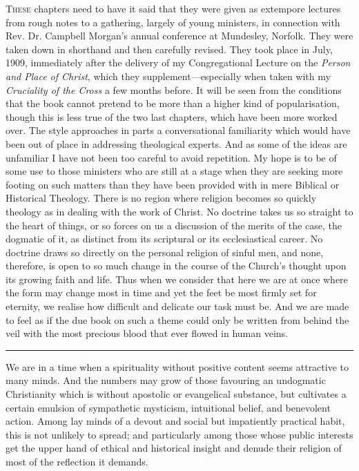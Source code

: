 \documentclass[12pt,a5paper,twoside,titlepage]{book}
\begin{document}
\textsc{These} chapters need to have it said that 
they were given as extempore lectures 
from rough notes to a gathering, largely of 
young ministers, in connection with Rev. 
Dr. Campbell Morgan's annual conference at 
Mundesley, Norfolk. They were taken down 
in shorthand and then carefully revised. They 
took place in July, 1909, immediately after 
the delivery of my Congregational Lecture on 
the \textit{Person and Place of Christ}, which they 
supplement---especially when taken with my 
\textit{Cruciality of the Cross} a few months before. 
It will be seen from the conditions that the 
book cannot pretend to be more than a 
higher kind of popularisation, though this is 
less true of the two last chapters, which 
have been more worked over. The style approaches 
in parts a conversational familiarity 
which would have been out of place in addressing 
theological experts. And as some of the 
ideas are unfamiliar I have not been too careful 
to avoid repetition. My hope is to be of some 
use to those ministers who are still at a 
stage when they are seeking more footing on 
such matters than they have been provided 
with in mere Biblical or Historical Theology. 
There is no region where religion becomes so 
quickly theology as in dealing with the work 
of Christ. No doctrine takes us so straight 
to the heart of things, or so forces on us a 
discussion of the merits of the case, the dogmatic 
of it, as distinct from its scriptural or 
its ecclesiastical career. No doctrine draws so 
directly on the personal religion of sinful men, 
and none, therefore, is open to so much change 
in the course of the Church's thought upon its 
growing faith and life. Thus when we consider 
that here we are at once where the form may 
change most in time and yet the feet be most 
firmly set for eternity, we realise how difficult 
and delicate our task must be. And we are 
made to feel as if the due book on such a 
theme could only be written from behind the 
veil with the most precious blood that ever 
flowed in human veins. 

\begin{center}
\noindent\rule{4cm}{0.4pt}
\end{center}

We are in a time when a spirituality without 
positive content seems attractive to many minds. 
And the numbers may grow of those favouring 
an undogmatic Christianity which is without 
apostolic or evangelical substance, but cultivates 
a certain emulsion of sympathetic mysticism, 
intuitional belief, and benevolent action. Among 
lay minds of a devout and social but impatiently 
practical habit, this is not unlikely to spread; 
and particularly among those whose public interests 
get the upper hand of ethical and 
historical insight and denude their religion of 
most of the reflection it demands. 
\end{document}
